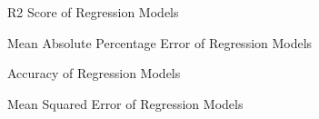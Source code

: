 \documentclass{article}
\begin{document}
  

  



\begin{figure}[h]  
    \centering  
    \scalebox{0.5}{}
    \caption{R2 Score of Regression Models}  
    \label{fig:r2_score}  
\end{figure}  

\begin{figure}[h]  
    \centering  
    \scalebox{0.5}{}
    \caption{Mean Absolute Percentage Error of Regression Models}  
    \label{fig:mape}  
\end{figure}  

\begin{figure}[h]  
    \centering  
    \scalebox{0.5}{}
    \caption{Accuracy of Regression Models}  
    \label{fig:accuracy}  
\end{figure}  

\begin{figure}[h]  
    \centering  
    \scalebox{0.5}{}
    \caption{Mean Squared Error of Regression Models}  
    \label{fig:mse}  
\end{figure}
\end{document}
